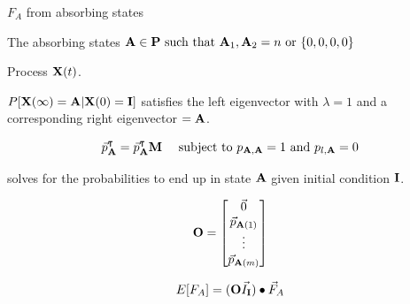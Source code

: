 \documentclass{beamer}
\begin{document}
\begin{frame}{$F_A$ from absorbing states}

    The absorbing states $\bold{A} \in \bold{P} \text{ such that } \bold{A}_1,\bold{A}_2 = n \ \text{or } \{0,0,0,0\}$
    
    Process $\bold{X}(t)$.
    
    $P[\bold{X}(\infty) = \bold{A}| \bold{X}(0) = \bold{I}]$ satisfies the left eigenvector with $\lambda = 1$ and a corresponding right eigenvector $=\bold{A}$.
    
    \begin{equation*}
        \vec{p}_\bold{A}^\intercal = \vec{p}_\bold{A}^\intercal \bold{M} \ \ \ \  \text{subject to } p_{\bold{A},\bold{A}}=1 \ \text{and}\ p_{l,\bold{A}}=0
    \end{equation*}
    
    solves for the probabilities to end up in state $\bold{A}$ given initial condition $\bold{I}$.  
    
    \begin{equation*}
    \bold{O}=
        \begin{bmatrix}
        \vec{0}  \\
        \vec{p}_{\bold{A}(1)}  \\
        \vdots  \\
        \vec{p}_{\bold{A}(m)} 
    \end{bmatrix}   
    \end{equation*}
     
    \begin{equation*}
        E[F_A] = (\bold{O} \vec{I}_\bold{I}) \bullet \vec{F}_A   %
    \end{equation*}
\end{frame}
\end{document}
